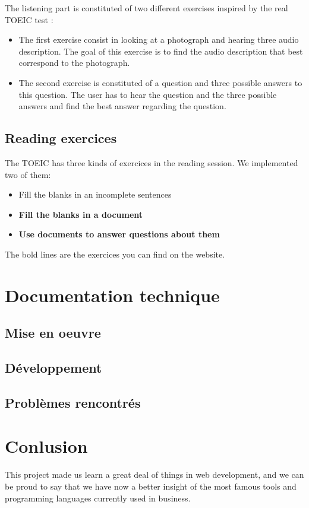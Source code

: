 \documentclass[12pt,a4paper]{report}
\begin{document}
The listening part is constituted of two different exercises inspired by the real TOEIC test :

\begin{itemize}
\item The first exercise consist in looking at a photograph and hearing three audio description. The goal of this exercise is to find the audio description that best correspond to the photograph.

\item The second exercise is constituted of a question and three possible answers to this question. The user has to hear the question and the three possible answers and find the best answer regarding the question.
\end{itemize}

\subsection{Reading exercices}
The TOEIC has three kinds of exercices in the reading session. We implemented
two of them:

\begin{itemize}
\item Fill the blanks in an incomplete sentences
\item \textbf{Fill the blanks in a document}
\item \textbf{Use documents to answer questions about them}
\end{itemize}

The bold lines are the exercices you can find on the website.

\pagebreak

\section{Documentation technique}
\subsection{Mise en oeuvre}

\subsection{Développement}
\subsection{Problèmes rencontrés}


\section*{Conlusion}
This project made us learn a great deal of things in web development, and we
can be proud to say that we have now a better insight of the most famous tools
and programming languages currently used in business.
 
\end{document}
